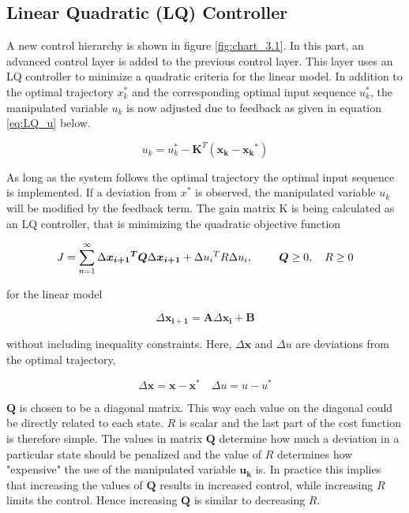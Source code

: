 \documentclass[a4paper, 12pt]{article}\usepackage[utf8]{inputenc}
\begin{document}
\subsection{Linear Quadratic (LQ) Controller}
A new control hierarchy is shown in figure \ref{fig:chart_3.1}. In this part, an advanced control layer is added to the previous control layer. This layer uses an LQ controller to minimize a quadratic criteria for the linear model. In addition to the optimal trajectory $x_{k}^*$ and the corresponding optimal input sequence $u_{k}^*$, the manipulated variable $u_{k}$ is now adjusted due to feedback as given in equation \ref{eq:LQ_u} below.

\begin{equation}\label{eq:LQ_u}
    u_k=u_k^*-\boldsymbol{K}^T(\boldsymbol{x_k}-\boldsymbol{x_k}^*)
\end{equation}

As long as the system follows the optimal trajectory the optimal input sequence is implemented. If a deviation from $x^*$ is observed, the manipulated variable $u_k$ will be modified by the feedback term. The gain matrix K is being calculated as an LQ controller, that is minimizing the quadratic objective function

\begin{equation}\label{eq:LQ_cost}
    J=\sum_{n=1}^{\infty}\Delta\boldsymbol{{x_{i+1}}^T}\boldsymbol{Q}\Delta\boldsymbol{{x_{i+1}}} + \Delta{u_i}^TR\Delta{u_i}, \begin{tabular}{cc}
         &  \\
         & 
    \end{tabular} \boldsymbol{Q}\geq0, \quad R\geq 0
\end{equation}

for the linear model 

\begin{equation}
    \Delta\boldsymbol{{x_{i+1}}}=\boldsymbol{A}\Delta\boldsymbol{{x_i}}+\boldsymbol{B}
\end{equation}

without including inequality constraints. Here, $\Delta\boldsymbol{{x}}$ and $\Delta{u}$ are deviations from the optimal trajectory, 

\begin{equation}
    \Delta\boldsymbol{{x}}=\boldsymbol{x}-\boldsymbol{x}^* \quad \Delta{u}=u-u^*
\end{equation}

$\boldsymbol{Q}$ is chosen to be a diagonal matrix. This way each value on the diagonal could be directly related  to each state. $R$ is scalar and the last part of the cost function is therefore simple. The values in matrix $\boldsymbol{Q}$ determine how much a deviation in a particular state should be penalized and the value of $R$ determines how "expensive" the use of the manipulated variable $\boldsymbol{u_k}$ is. In practice this implies that increasing the values of $\boldsymbol{Q}$ results in increased control, while increasing $R$ limits the control. Hence increasing $\boldsymbol{Q}$ is similar to decreasing $R$. 
\end{document}
